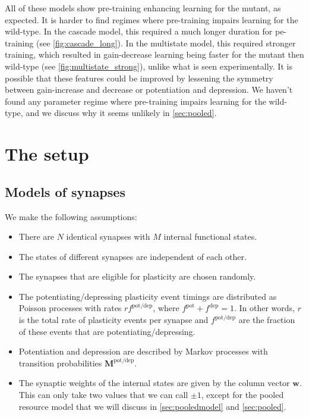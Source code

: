 \documentclass[12pt]{article}
\newcommand{\w}{\mathbf{w}}
\newcommand{\M}{\mathbf{M}}
\newcommand{\pot}{^{\text{pot}}}
\newcommand{\dep}{^{\text{dep}}}
\newcommand{\potdep}{^{\text{pot/dep}}}
\begin{document}
All of these models show pre-training enhancing learning for the mutant, as expected.
It is harder to find regimes where pre-training impairs learning for the wild-type.
In the cascade model, this required a much longer duration for pe-training (see \autoref{fig:cascade_long}).
In the multistate model, this required stronger training, which resulted in gain-decrease learning being faster for the mutant then wild-type (see \autoref{fig:multistate_strong}), unlike what is seen experimentally.
It is possible that these features could be improved by lessening the symmetry between gain-increase and decrease or potentiation and depression.
We haven't found any parameter regime where pre-training impairs learning for the wild-type, and we discuss why it seems unlikely in \autoref{sec:pooled}.


\section{The setup}\label{sec:setup}


\subsection{Models of synapses}\label{sec:synapse}

We make the following assumptions:
\begin{itemize}
  \item There are $N$ identical synapses with $M$ internal functional states.
  \item The states of different synapses are independent of each other.
  \item The synapses that are eligible for plasticity are chosen randomly.
  \item The potentiating/depressing plasticity event timings are distributed as Poisson processes with rates $rf\potdep$, where $f\pot+f\dep=1$.
      In other words, $r$ is the total rate of plasticity events per synapse and $f\potdep$ are the fraction of these events that are potentiating/depressing.
  \item Potentiation and depression are described by Markov processes with transition probabilities $\M\potdep$.
  \item The synaptic weights of the internal states are given by the column vector $\w$. This can only take two values that we can call $\pm1$, except for the pooled resource model that we will discuss in \autoref{sec:pooledmodel} and \autoref{sec:pooled}.
\end{itemize}
\end{document}
